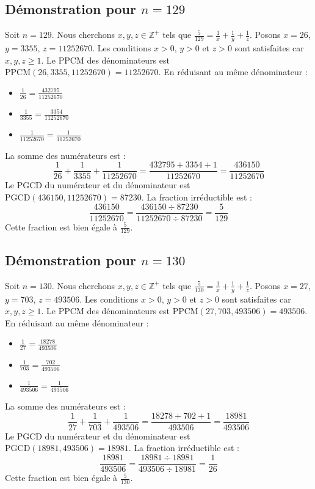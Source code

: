 \documentclass[11pt,a4paper]{article}
\begin{document}
\subsection{Démonstration pour $n = 129$}
Soit $n = 129$. Nous cherchons $x, y, z \in \mathbb{Z}^{+}$ tels que $\frac{5}{129} = \frac{1}{x} + \frac{1}{y} + \frac{1}{z}$.
Posons $x = 26$, $y = 3355$, $z = 11252670$.
Les conditions $x > 0$, $y > 0$ et $z > 0$ sont satisfaites car $x, y, z \geq 1$.
Le PPCM des dénominateurs est $\text{PPCM}(26, 3355, 11252670) = 11252670$.
En réduisant au même dénominateur :
\begin{itemize}
    \item $\frac{1}{26} = \frac{432795}{11252670}$
    \item $\frac{1}{3355} = \frac{3354}{11252670}$
    \item $\frac{1}{11252670} = \frac{1}{11252670}$
\end{itemize}
La somme des numérateurs est :
$$ \frac{1}{26} + \frac{1}{3355} + \frac{1}{11252670} = \frac{432795 + 3354 + 1}{11252670} = \frac{436150}{11252670} $$
Le PGCD du numérateur et du dénominateur est $\text{PGCD}(436150, 11252670) = 87230$.
La fraction irréductible est :
$$ \frac{436150}{11252670} = \frac{436150 \div 87230}{11252670 \div 87230} = \frac{5}{129} $$
Cette fraction est bien égale à $\frac{5}{129}$.

\subsection{Démonstration pour $n = 130$}
Soit $n = 130$. Nous cherchons $x, y, z \in \mathbb{Z}^{+}$ tels que $\frac{5}{130} = \frac{1}{x} + \frac{1}{y} + \frac{1}{z}$.
Posons $x = 27$, $y = 703$, $z = 493506$.
Les conditions $x > 0$, $y > 0$ et $z > 0$ sont satisfaites car $x, y, z \geq 1$.
Le PPCM des dénominateurs est $\text{PPCM}(27, 703, 493506) = 493506$.
En réduisant au même dénominateur :
\begin{itemize}
    \item $\frac{1}{27} = \frac{18278}{493506}$
    \item $\frac{1}{703} = \frac{702}{493506}$
    \item $\frac{1}{493506} = \frac{1}{493506}$
\end{itemize}
La somme des numérateurs est :
$$ \frac{1}{27} + \frac{1}{703} + \frac{1}{493506} = \frac{18278 + 702 + 1}{493506} = \frac{18981}{493506} $$
Le PGCD du numérateur et du dénominateur est $\text{PGCD}(18981, 493506) = 18981$.
La fraction irréductible est :
$$ \frac{18981}{493506} = \frac{18981 \div 18981}{493506 \div 18981} = \frac{1}{26} $$
Cette fraction est bien égale à $\frac{5}{130}$.
\end{document}
